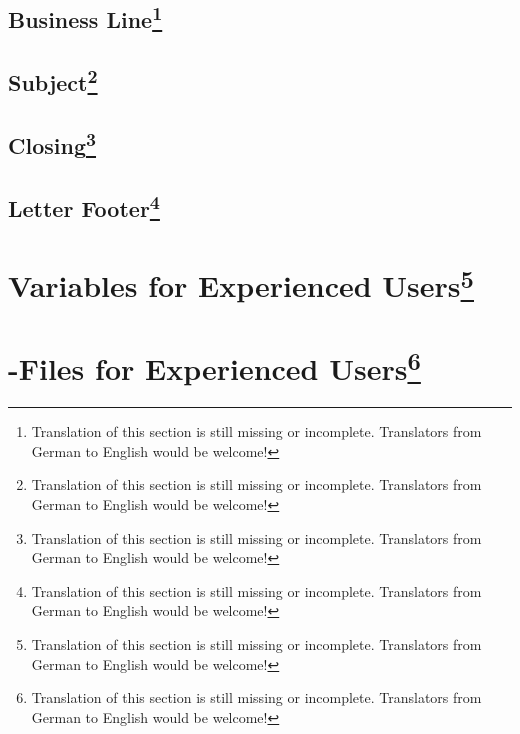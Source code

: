 \mbox{}%

\subsection{Business Line\protect\footnote{Translation of
    this section is still missing or incomplete. Translators from German to
    English would be welcome!}}
\label{sec:scrlttr2-experts.refLine}%

\mbox{}%

\subsection{Subject\protect\footnote{Translation of
    this section is still missing or incomplete. Translators from German to
    English would be welcome!}}
\label{sec:scrlttr2-experts.subject}%

\mbox{}%

\subsection{Closing\protect\footnote{Translation of
    this section is still missing or incomplete. Translators from German to
    English would be welcome!}}
\label{sec:scrlttr2-experts.closing}

\mbox{}%

\subsection{Letter Footer\protect\footnote{Translation of
    this section is still missing or incomplete. Translators from German to
    English would be welcome!}}
\label{sec:scrlttr2-experts.firstFoot}%

\mbox{}%
%
%

\section{Variables for Experienced Users\protect\footnote{Translation of
    this section is still missing or incomplete. Translators from German to
    English would be welcome!}}
\label{sec:scrlttr2-experts.variables}

\mbox{}%

\section{-Files for Experienced Users\protect\footnote{Translation of
    this section is still missing or incomplete. Translators from German to
    English would be welcome!}}
\label{sec:scrlttr2-experts.variables}

